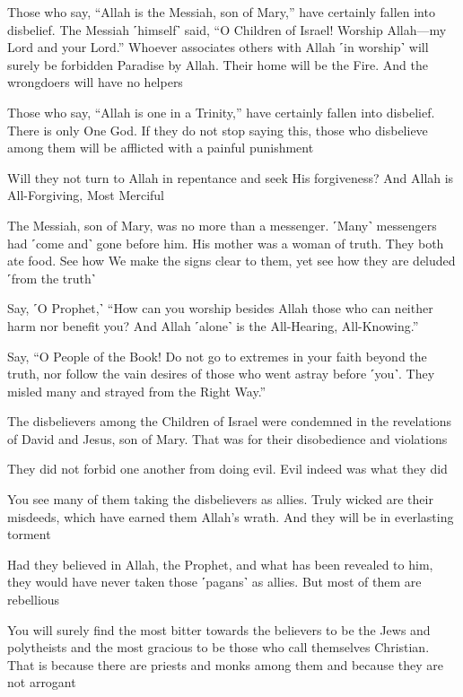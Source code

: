 Those who say, “Allah is the Messiah, son of Mary,” have certainly fallen into disbelief. The Messiah ˹himself˺ said, “O Children of Israel! Worship Allah—my Lord and your Lord.” Whoever associates others with Allah ˹in worship˺ will surely be forbidden Paradise by Allah. Their home will be the Fire. And the wrongdoers will have no helpers

Those who say, “Allah is one in a Trinity,” have certainly fallen into disbelief. There is only One God. If they do not stop saying this, those who disbelieve among them will be afflicted with a painful punishment

Will they not turn to Allah in repentance and seek His forgiveness? And Allah is All-Forgiving, Most Merciful

The Messiah, son of Mary, was no more than a messenger. ˹Many˺ messengers had ˹come and˺ gone before him. His mother was a woman of truth. They both ate food. See how We make the signs clear to them, yet see how they are deluded ˹from the truth˺

Say, ˹O Prophet,˺ “How can you worship besides Allah those who can neither harm nor benefit you? And Allah ˹alone˺ is the All-Hearing, All-Knowing.”

Say, “O People of the Book! Do not go to extremes in your faith beyond the truth, nor follow the vain desires of those who went astray before ˹you˺. They misled many and strayed from the Right Way.”

The disbelievers among the Children of Israel were condemned in the revelations of David and Jesus, son of Mary. That was for their disobedience and violations

They did not forbid one another from doing evil. Evil indeed was what they did

You see many of them taking the disbelievers as allies. Truly wicked are their misdeeds, which have earned them Allah’s wrath. And they will be in everlasting torment

Had they believed in Allah, the Prophet, and what has been revealed to him, they would have never taken those ˹pagans˺ as allies. But most of them are rebellious

You will surely find the most bitter towards the believers to be the Jews and polytheists and the most gracious to be those who call themselves Christian. That is because there are priests and monks among them and because they are not arrogant

